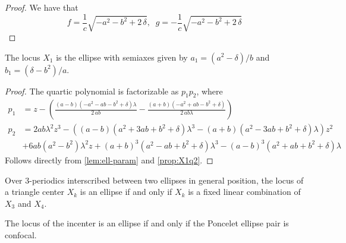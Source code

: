 \begin{proof}
We have that
\[f={\frac {1}{c}\sqrt {-{a}^{2}-{b}^{2}+2\,\delta}}, \;\; g= -{\frac {1}{c}\sqrt {-{a}^{2}-{b}^{2}+2\,\delta}}\]
\end{proof}

\begin{corollary}
The locus $X_1$ is the ellipse with semiaxes given by $a_1=(a^2-\delta)/b$ and $b_1=(\delta-b^2)/a.$

 
\end{corollary}

\begin{proof}
The quartic polynomial is factorizable as $p_1p_2$, where
\begin{align*}
    p_1&=z-\left({\frac { \left( a-b \right)  \left( -{a}^{2}-a b-{b}^{2}+\delta
 \right) \lambda}{2\,a b}}-{\frac { \left( a+b \right)  \left( -{a}^{2}
+a b-{b}^{2}+\delta \right) }{2\,a b\lambda}}\right)
\\
    p_2&=2 a b \lambda^2 z^3 - ((a - b) (a^2 + 3 a b + b^2 + \delta) \lambda^3 - (a + b) (a^2 - 3 a b + b^2 + \delta) \lambda) z^2\\
    &+ 6 a b  (a^2 - b^2) \lambda^2 z + (a + b)^3 (a^2 - a b + b^2 + \delta) \lambda^3 - (a - b)^3 (a^2 + a b + b^2 + \delta) \lambda
\end{align*}
Follows directly from  \cref{lem:ell-param} and  \cref{prop:X1q2}.
\end{proof}

\cite{schwartz2016-com}

\begin{conjecture}
Over 3-periodics interscribed between two ellipses in general position, the locus of a triangle center $X_k$ is an ellipse if and only if $X_k$ is a fixed linear combination of $X_3$ and $X_4$.
\end{conjecture}

\begin{conjecture}
The locus of the incenter is an ellipse if and only if the Poncelet ellipse pair is confocal.
\end{conjecture}